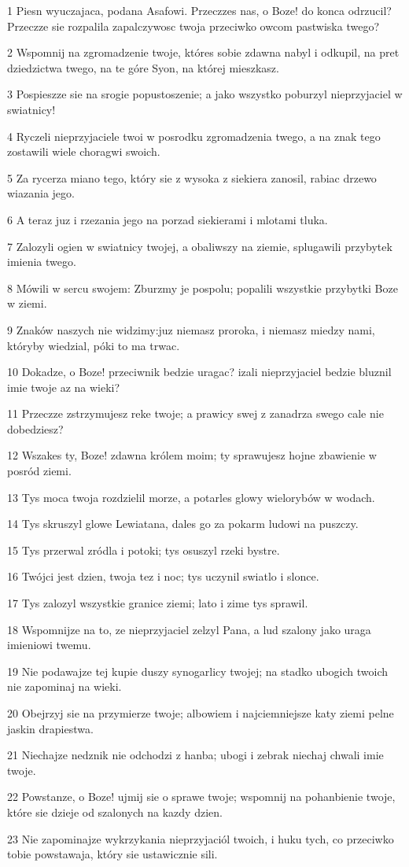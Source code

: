 \par 1 Piesn wyuczajaca, podana Asafowi. Przeczzes nas, o Boze! do konca odrzucil? Przeczze sie rozpalila zapalczywosc twoja przeciwko owcom pastwiska twego?
\par 2 Wspomnij na zgromadzenie twoje, któres sobie zdawna nabyl i odkupil, na pret dziedzictwa twego, na te góre Syon, na której mieszkasz.
\par 3 Pospieszze sie na srogie popustoszenie; a jako wszystko poburzyl nieprzyjaciel w swiatnicy!
\par 4 Ryczeli nieprzyjaciele twoi w posrodku zgromadzenia twego, a na znak tego zostawili wiele choragwi swoich.
\par 5 Za rycerza miano tego, który sie z wysoka z siekiera zanosil, rabiac drzewo wiazania jego.
\par 6 A teraz juz i rzezania jego na porzad siekierami i mlotami tluka.
\par 7 Zalozyli ogien w swiatnicy twojej, a obaliwszy na ziemie, splugawili przybytek imienia twego.
\par 8 Mówili w sercu swojem: Zburzmy je pospolu; popalili wszystkie przybytki Boze w ziemi.
\par 9 Znaków naszych nie widzimy:juz niemasz proroka, i niemasz miedzy nami, któryby wiedzial, póki to ma trwac.
\par 10 Dokadze, o Boze! przeciwnik bedzie uragac? izali nieprzyjaciel bedzie bluznil imie twoje az na wieki?
\par 11 Przeczze zstrzymujesz reke twoje; a prawicy swej z zanadrza swego cale nie dobedziesz?
\par 12 Wszakes ty, Boze! zdawna królem moim; ty sprawujesz hojne zbawienie w posród ziemi.
\par 13 Tys moca twoja rozdzielil morze, a potarles glowy wielorybów w wodach.
\par 14 Tys skruszyl glowe Lewiatana, dales go za pokarm ludowi na puszczy.
\par 15 Tys przerwal zródla i potoki; tys osuszyl rzeki bystre.
\par 16 Twójci jest dzien, twoja tez i noc; tys uczynil swiatlo i slonce.
\par 17 Tys zalozyl wszystkie granice ziemi; lato i zime tys sprawil.
\par 18 Wspomnijze na to, ze nieprzyjaciel zelzyl Pana, a lud szalony jako uraga imieniowi twemu.
\par 19 Nie podawajze tej kupie duszy synogarlicy twojej; na stadko ubogich twoich nie zapominaj na wieki.
\par 20 Obejrzyj sie na przymierze twoje; albowiem i najciemniejsze katy ziemi pelne jaskin drapiestwa.
\par 21 Niechajze nedznik nie odchodzi z hanba; ubogi i zebrak niechaj chwali imie twoje.
\par 22 Powstanze, o Boze! ujmij sie o sprawe twoje; wspomnij na pohanbienie twoje, które sie dzieje od szalonych na kazdy dzien.
\par 23 Nie zapominajze wykrzykania nieprzyjaciól twoich, i huku tych, co przeciwko tobie powstawaja, który sie ustawicznie sili.

